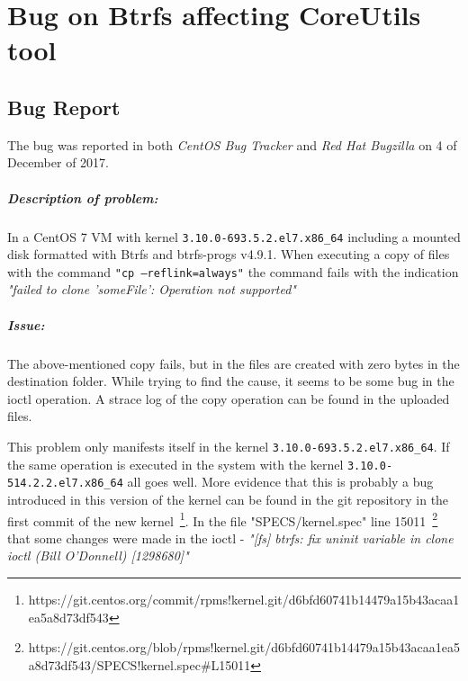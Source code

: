 \chapter{Bug on Btrfs affecting CoreUtils tool}
\label{ann:bug}

\section{Bug Report}
\label{sec:bug_report}

The bug was reported in both \textit{CentOS Bug Tracker} and \textit{Red Hat Bugzilla} on 4 of December of 2017.

\paragraph{Description of problem:}

In a CentOS 7 VM with kernel \texttt{3.10.0-693.5.2.el7.x86\_64} including a mounted disk formatted with Btrfs and btrfs-progs v4.9.1.
When executing a copy of files with the command \texttt{"cp --reflink=always"} the command fails with the indication \textit{"failed to clone 'someFile': Operation not supported"}

\paragraph{Issue:}

The above-mentioned copy fails, but in the files are created with zero bytes in the destination folder.
While trying to find the cause, it seems to be some bug in the ioctl operation. A strace log of the copy operation can be found in the uploaded files.

This problem only manifests itself in the kernel \texttt{3.10.0-693.5.2.el7.x86\_64}. If the same operation is executed in the system with the kernel \texttt{3.10.0-514.2.2.el7.x86\_64} all goes well.
More evidence that this is probably a bug introduced in this version of the kernel can be found in the git repository in the first commit of the new kernel~\footnote{https://git.centos.org/commit/rpms!kernel.git/d6bfd60741b14479a15b43acaa1ea5a8d73df543}.
In the file "SPECS/kernel.spec" line 15011~\footnote{https://git.centos.org/blob/rpms!kernel.git/d6bfd60741b14479a15b43acaa1ea5a8d73df543/SPECS!kernel.spec\#L15011} that some changes were made in the ioctl - \textit{"[fs] btrfs: fix uninit variable in clone ioctl (Bill O'Donnell) [1298680]"}

